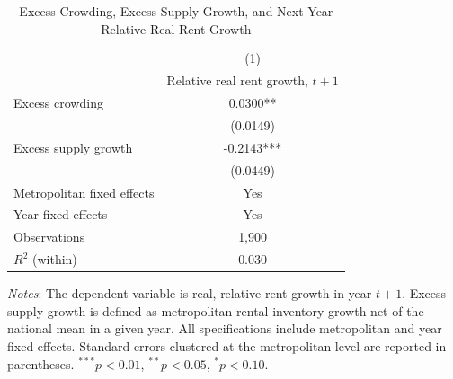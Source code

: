 \begin{table}[!htbp]
\centering
\caption{Excess Crowding, Excess Supply Growth, and Next-Year Relative Real Rent Growth}
\label{tab:excess_supply_spec}
\begin{tabular}{l c}
\hline\hline
 & (1) \\
 & Relative real rent growth, $t+1$ \\
\hline
Excess crowding          & 0.0300** \\
                         & (0.0149) \\
Excess supply growth     & -0.2143*** \\
                         & (0.0449) \\
\hline
Metropolitan fixed effects & Yes \\
Year fixed effects         & Yes \\
Observations               & 1,900 \\
$R^{2}$ (within)           & 0.030 \\
\hline\hline
\end{tabular}

\begin{flushleft}
\footnotesize
\textit{Notes}: The dependent variable is real, relative rent growth in year $t+1$.
Excess supply growth is defined as metropolitan rental inventory growth net of the
national mean in a given year. All specifications include metropolitan and year fixed
effects. Standard errors clustered at the metropolitan level are reported in parentheses.
$^{***}p<0.01$, $^{**}p<0.05$, $^{*}p<0.10$.
\end{flushleft}
\end{table}
